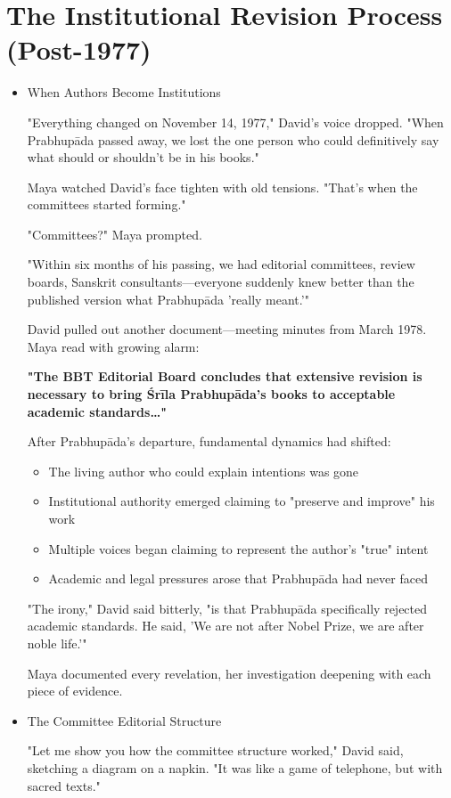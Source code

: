 \documentclass[11pt,twoside]{book}
\begin{document}
\section*{The Institutional Revision Process (Post-1977)}
\label{sec:org9b71413}

\begin{itemize}
\item When Authors Become Institutions
\label{sec:org99e79aa}

"Everything changed on November 14, 1977," David's voice dropped. "When Prabhupāda passed away, we lost the one person who could definitively say what should or shouldn't be in his books."

Maya watched David's face tighten with old tensions. "That's when the committees started forming."

"Committees?" Maya prompted.

"Within six months of his passing, we had editorial committees, review boards, Sanskrit consultants—everyone suddenly knew better than the published version what Prabhupāda 'really meant.'"

David pulled out another document—meeting minutes from March 1978. Maya read with growing alarm:

\textbf{"The BBT Editorial Board concludes that extensive revision is necessary to bring Śrīla Prabhupāda's books to acceptable academic standards\ldots{}"}

After Prabhupāda's departure, fundamental dynamics had shifted:
\begin{itemize}
\item The living author who could explain intentions was gone
\item Institutional authority emerged claiming to "preserve and improve" his work
\item Multiple voices began claiming to represent the author's "true" intent
\item Academic and legal pressures arose that Prabhupāda had never faced
\end{itemize}

"The irony," David said bitterly, "is that Prabhupāda specifically rejected academic standards. He said, 'We are not after Nobel Prize, we are after noble life.'"

Maya documented every revelation, her investigation deepening with each piece of evidence.
\item The Committee Editorial Structure
\label{sec:org3d81fe9}

"Let me show you how the committee structure worked," David said, sketching a diagram on a napkin. "It was like a game of telephone, but with sacred texts."


\end{itemize}
\end{document}
